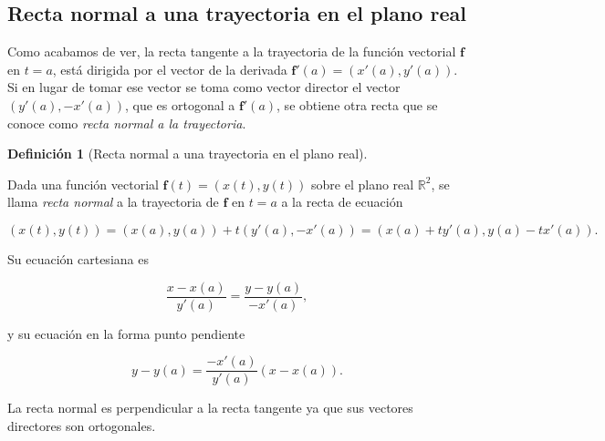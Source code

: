 \documentclass[
  a4paper,
]{scrreport}
\theoremstyle{definition}
\theoremstyle{definition}
\theoremstyle{definition}
\newtheorem{definition}{Definición}[chapter]
\theoremstyle{plain}
\theoremstyle{plain}
\theoremstyle{plain}
\theoremstyle{remark}
\begin{document}
\subsection{Recta normal a una trayectoria en el plano
real}\label{recta-normal-a-una-trayectoria-en-el-plano-real}

Como acabamos de ver, la recta tangente a la trayectoria de la función
vectorial \(\mathbf{f}\) en \(t=a\), está dirigida por el vector de la
derivada \(\mathbf{f}'(a)=(x'(a),y'(a))\). Si en lugar de tomar ese
vector se toma como vector director el vector \((y'(a),-x'(a))\), que es
ortogonal a \(\mathbf{f}'(a)\), se obtiene otra recta que se conoce como
\emph{recta normal a la trayectoria}.

\begin{definition}[Recta normal a una trayectoria en el plano
real]\protect\hypertarget{def-normal-trayectoria-plano}{}\label{def-normal-trayectoria-plano}

Dada una función vectorial \(\mathbf{f}(t)=(x(t),y(t))\) sobre el plano
real \(\mathbb{R}^2\), se llama \emph{recta normal} a la trayectoria de
\(\mathbf{f}\) en \(t=a\) a la recta de ecuación

\[
(x(t),y(t)) = (x(a),y(a))+t(y'(a),-x'(a)) = (x(a)+ty'(a),y(a)-tx'(a)).
\]

\end{definition}

Su ecuación cartesiana es

\[
\frac{x-x(a)}{y'(a)} = \frac{y-y(a)}{-x'(a)},
\]

y su ecuación en la forma punto pendiente

\[
y-y(a) = \frac{-x'(a)}{y'(a)}(x-x(a)).
\]

\begin{tcolorbox}[enhanced jigsaw, bottomtitle=1mm, title=\textcolor{quarto-callout-note-color}{\faInfo}\hspace{0.5em}{Nota}, colbacktitle=quarto-callout-note-color!10!white, coltitle=black, leftrule=.75mm, colback=white, toptitle=1mm, toprule=.15mm, titlerule=0mm, opacitybacktitle=0.6, colframe=quarto-callout-note-color-frame, bottomrule=.15mm, arc=.35mm, rightrule=.15mm, breakable, left=2mm, opacityback=0]

La recta normal es perpendicular a la recta tangente ya que sus vectores
directores son ortogonales.

\end{tcolorbox}
\end{document}
